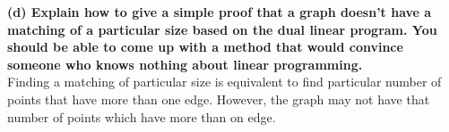 \documentclass{article}
\begin{document}
\textbf{(d) Explain how to give a simple proof that a graph doesn’t have a matching of a particular size based on the dual linear program. You should be able to come up with a method that would convince someone who knows nothing about linear programming.
} \\ \newline
Finding a matching of particular size is equivalent to find particular number of points that have more than one edge. However, the graph may not have that number of points which have more than on edge. \\ \newline
\end{document}
